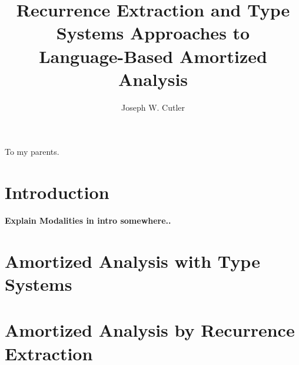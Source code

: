 \documentclass[draft]{westhesis}
\title{Recurrence Extraction and Type Systems Approaches to\\ Language-Based Amortized Analysis}
\author{Joseph W. Cutler}
\begin{document}
\begin{abstract}
\end{abstract}

\begin{dedication}
To my parents.
\end{dedication}

\begin{acknowledgements}
\end{acknowledgements}


\setcounter{tocdepth}{2}
\tableofcontents
\mainmatter

\chapter{Introduction} 
%  
\textbf{Explain Modalities in intro somewhere..}

\chapter{Amortized Analysis with Type Systems}
\label{chap:lambda-amor}



\chapter{Amortized Analysis by Recurrence Extraction}
\label{chap:rec-extr}




\end{document}

